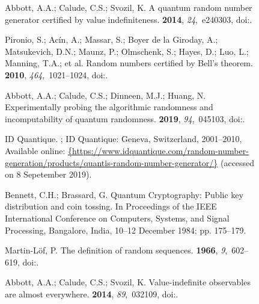 \documentclass[entropy,article,accept,oneauthor,pdftex]{Definitions/mdpi}
\begin{document}
\begin{figure}[H]
\begin{thebibliography}{999}
Abbott, A.A.; Calude, C.S.; Svozil, K.
\newblock A quantum random number generator certified by value indefiniteness.
 {\bf 2014}, {\em 24},~e240303, doi:{\href{https://doi.org/10.1017/S0960129512000692}{}}.

Pironio, S.; Ac{\'i}n, A.; Massar, S.; {Boyer de la Giroday}, A.; Matsukevich,
  D.N.; Maunz, P.; Olmschenk, S.; Hayes, D.; Luo, L.; Manning, T.A.; et al.
\newblock Random numbers certified by {B}ell's theorem.
 {\bf 2010}, {\em 464},~1021--1024, doi:{\href{https://doi.org/10.1038/nature09008}{}}.

Abbott, A.A.; Calude, C.S.; Dinneen, M.J.; Huang, N.
\newblock Experimentally probing the algorithmic randomness and incomputability
  of quantum randomness.
 {\bf 2019}, {\em 94},~045103, doi:{\href{https://doi.org/10.1088/1402-4896/aaf36a}{}}.

{ID Quantique}.
; ID Quantique: Geneva, Switzerland,  2001--2010,
Available online: \url{{https://www.idquantique.com/random-number-generation/products/quantis-random-number-generator/}}  (accessed on 8 Sepetember 2019).

Bennett, C.H.; Brassard, G.
\newblock Quantum Cryptography: Public key distribution and coin tossing.
\newblock  In Proceedings of the IEEE International Conference on Computers,
  Systems, and Signal Processing, Bangalore, India, 10--12 December 1984; pp. 175--179.

Martin-L{\"{o}}f, P.
\newblock The definition of random sequences.
 {\bf 1966}, {\em 9},~602--619, doi:{\href{https://doi.org/10.1016/S0019-9958(66)80018-9}{}}.

Abbott, A.A.; Calude, C.S.; Svozil, K.
\newblock Value-indefinite observables are almost everywhere.
 {\bf 2014}, {\em 89},~032109, doi:{\href{https://doi.org/10.1103/PhysRevA.89.032109}{}}.


\end{thebibliography}
\end{figure}
\end{document}

